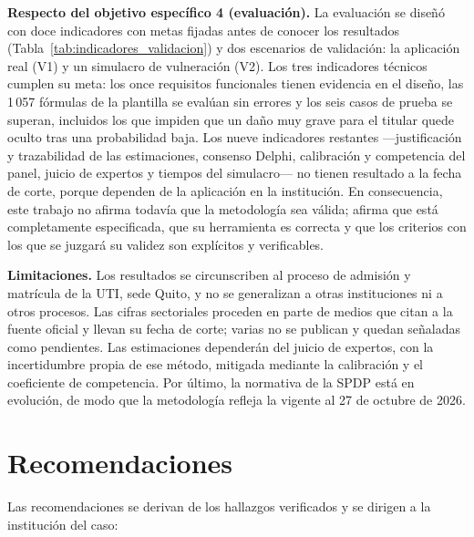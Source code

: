 \textbf{Respecto del objetivo específico 4 (evaluación).} La evaluación se diseñó con doce indicadores con metas fijadas antes de conocer los resultados (Tabla~\ref{tab:indicadores_validacion}) y dos escenarios de validación: la aplicación real (V1) y un simulacro de vulneración (V2). Los tres indicadores técnicos cumplen su meta: los once requisitos funcionales tienen evidencia en el diseño, las 1\,057 fórmulas de la plantilla se evalúan sin errores y los seis casos de prueba se superan, incluidos los que impiden que un daño muy grave para el titular quede oculto tras una probabilidad baja. Los nueve indicadores restantes ---justificación y trazabilidad de las estimaciones, consenso Delphi, calibración y competencia del panel, juicio de expertos y tiempos del simulacro--- no tienen resultado a la fecha de corte, porque dependen de la aplicación en la institución. En consecuencia, este trabajo no afirma todavía que la metodología sea válida; afirma que está completamente especificada, que su herramienta es correcta y que los criterios con los que se juzgará su validez son explícitos y verificables.

\textbf{Limitaciones.} Los resultados se circunscriben al proceso de admisión y matrícula de la UTI, sede Quito, y no se generalizan a otras instituciones ni a otros procesos. Las cifras sectoriales proceden en parte de medios que citan a la fuente oficial y llevan su fecha de corte; varias no se publican y quedan señaladas como pendientes. Las estimaciones dependerán del juicio de expertos, con la incertidumbre propia de ese método, mitigada mediante la calibración y el coeficiente de competencia. Por último, la normativa de la SPDP está en evolución, de modo que la metodología refleja la vigente al 27 de octubre de 2026.

\section{Recomendaciones}

Las recomendaciones se derivan de los hallazgos verificados y se dirigen a la institución del caso:

